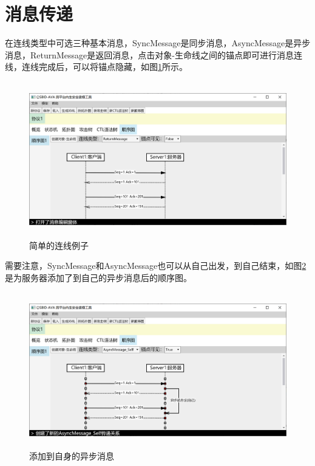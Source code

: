 \section{消息传递}
在连线类型中可选三种基本消息，SyncMessage是同步消息，AsyncMessage是异步消息，ReturnMessage是返回消息，点击对象-生命线之间的锚点即可进行消息连线，连线完成后，可以将锚点隐藏，如图\ref{sequencediagram_simple}所示。
\begin{figure}[h]
	\centering
	\includegraphics[width=12cm,height=6.75cm]{imgs/sequencediagram_simple.png}
	\caption{简单的连线例子}
	\label{sequencediagram_simple}
\end{figure}
\par
需要注意，SyncMessage和AsyncMessage也可以从自己出发，到自己结束，如图\ref{sequencediagram_simple2}是为服务器添加了到自己的异步消息后的顺序图。
\begin{figure}[h]
	\centering
	\includegraphics[width=12cm,height=6.75cm]{imgs/sequencediagram_simple2.png}
	\caption{添加到自身的异步消息}
	\label{sequencediagram_simple2}
\end{figure}
